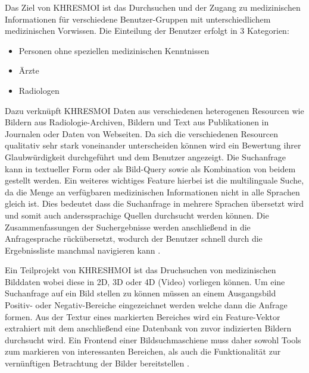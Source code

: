 Das Ziel von KHRESMOI ist das Durchsuchen und der Zugang zu medizinischen Informationen für verschiedene Benutzer-Gruppen mit unterschiedlichem medizinischen Vorwissen.
Die Einteilung der Benutzer erfolgt in 3 Kategorien:
\begin{itemize}
	\item Personen ohne speziellen medizinischen Kenntnissen
	\item Ärzte
	\item Radiologen
\end{itemize}
Dazu verknüpft KHRESMOI Daten aus verschiedenen heterogenen Resourcen wie Bildern aus Radiologie-Archiven, Bildern und Text aus Publikationen in Journalen oder Daten von  Webseiten.
Da sich die verschiedenen Resourcen qualitativ sehr stark voneinander unterscheiden können wird ein Bewertung ihrer Glaubwürdigkeit durchgeführt und dem Benutzer angezeigt.  
Die Suchanfrage kann in textueller Form oder als Bild-Query sowie als Kombination von beidem gestellt werden.
Ein weiteres wichtiges Feature hierbei ist die multilinguale Suche, da die Menge an verfügbaren medizinischen Informationen nicht in alle Sprachen gleich ist.
Dies bedeutet dass die Suchanfrage in mehrere Sprachen übersetzt wird und somit auch anderssprachige Quellen durchsucht werden können.
Die Zusammenfassungen der Suchergebnisse werden anschließend in die Anfragesprache rückübersetzt, 
wodurch der Benutzer schnell durch die Ergebnissliste manchmal navigieren kann \cite{kres}.

Ein Teilprojekt von KHRESHMOI ist das Druchsuchen von medizinischen Bilddaten wobei diese in 2D, 3D oder 4D (Video) vorliegen können.  
Um eine Suchanfrage auf ein Bild stellen zu können müssen an einem Ausgangsbild Positiv- oder Negativ-Bereiche eingezeichnet werden welche dann die Anfrage formen. 
Aus der Textur eines markierten Bereiches wird ein Feature-Vektor extrahiert mit dem anschließend eine Datenbank von zuvor indizierten Bildern durchsucht wird.
%
Ein Frontend einer Bildsuchmaschiene muss daher sowohl Tools zum markieren von interessanten Bereichen, 
als auch die Funktionalität zur vernünftigen Betrachtung der Bilder bereitstellen \cite{kres}.

